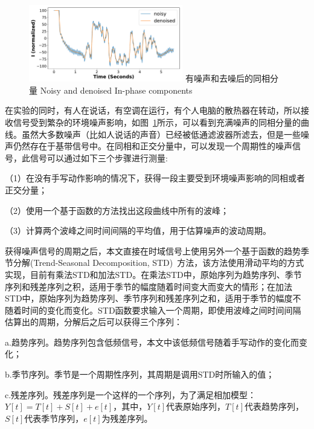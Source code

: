 \begin{figure}[!htp]
  \centering
  \includegraphics[width=0.6\textwidth]{figure/noisy-I.pdf}
  \bicaption
    {有噪声和去噪后的同相分量}
    {Noisy and denoised In-phase components}
  \label{fig:noisy-denoised-component}
\end{figure}
在实验的同时，有人在说话，有空调在运行，有个人电脑的散热器在转动，所以接收信号受到繁杂的环境噪声影响，如图~\ref{fig:noisy-denoised-component}所示，可以看到充满噪声的同相分量的曲线。虽然大多数噪声（比如人说话的声音）已经被低通滤波器所滤去，但是一些噪声仍然存在于基带信号中。在同相和正交分量中，可以发现一个周期性的噪声信号，此信号可以通过如下三个步骤进行测量:

（1）在没有手写动作影响的情况下，获得一段主要受到环境噪声影响的同相或者正交分量；

（2）使用一个基于函数的方法找出这段曲线中所有的波峰；

（3）计算两个波峰之间时间间隔的平均值，用于估算噪声的波动周期。

获得噪声信号的周期之后，本文直接在时域信号上使用另外一个基于函数的趋势季节分解(Trend-Seasonal Decomposition, STD)~\cite{cleveland1990stl}方法，该方法使用滑动平均的方式实现，目前有乘法STD和加法STD。在乘法STD中，原始序列为趋势序列、季节序列和残差序列之积，适用于季节的幅度随着时间变大而变大的情形；在加法STD中，原始序列为趋势序列、季节序列和残差序列之和，适用于季节的幅度不随着时间的变化而变化。STD函数要求输入一个周期，即使用波峰之间时间间隔估算出的周期，分解后之后可以获得三个序列：

a.趋势序列。趋势序列包含低频信号，本文中该低频信号随着手写动作的变化而变化；

b.季节序列。季节是一个周期性序列，其周期是调用STD时所输入的值；

c.残差序列。残差序列是一个这样的一个序列，为了满足相加模型：$Y[t] = T[t] + S[t] + e[t]$，其中，$Y[t]$代表原始序列，$T[t]$代表趋势序列，$S[t]$代表季节序列，$e[t]$为残差序列。

